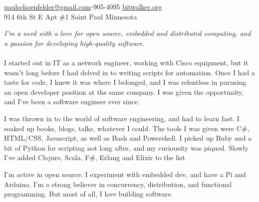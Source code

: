\documentclass[10pt,a4paper]{article}
\begin{document}
\sloppy  %



\nobreakvspace{0.3em}  %

\noindent\href{mailto:paulschoenfelder@gmail.com}{paulschoenfelder\mbox{}@\mbox{}gmail.com}-905-4095\sbull
\href{http://bitwalker.org}{bitwalker.org}
\\
914 6th St E\sbull
Apt \#1\sbull
Saint Paul\sbull
Minnesota

\spacedhrule{0.9em}{-0.4em}  %


\vspace{-1.3em}  %
\begin{multicols}{2}  %
\noindent \emph{I'm a nerd with a love for open source, embedded and distributed computing, and a passion for developing high-quality software.}
\\
\\
I started out in IT as a network engineer, working with Cisco equipment, but it wasn't long before I had delved in to writing scripts for automation. Once I had a taste for code, I knew it was where I belonged, and I was relentless in purusing an open developer position at the same company. I was given the opportunity, and I've been a software engineer ever since.

I was thrown in to the world of software engineering, and had to learn fast. I soaked up books, blogs, talks, whatever I could. The tools I was given were C\#, HTML/CSS, Javascript, as well as Bash and Powershell. I picked up Ruby and a bit of Python for scripting not long after, and my curiousity was piqued. Slowly I've added Clojure, Scala, F\#, Erlang and Elixir to the list

I'm active in open source. I experiment with embedded dev, and have a Pi and Arduino. I'm a strong believer in concurrency, distribution, and functional programming. But most of all, I love building software.
\end{multicols}
\end{document}
